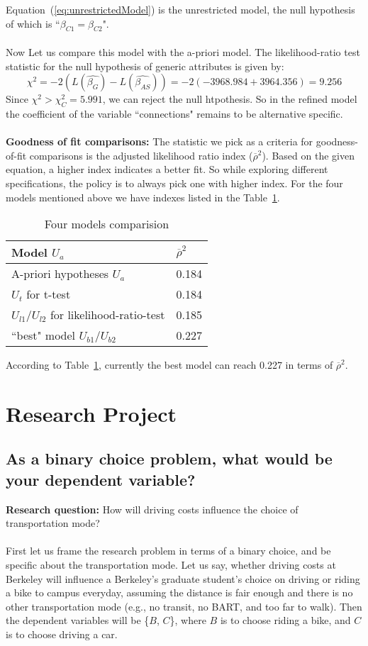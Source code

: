 \documentclass[11pt]{article}
\begin{document}
Equation~(\ref{eq:unrestrictedModel}) is the unrestricted model, the null hypothesis of which is ``$\beta_{C1}=\beta_{C2}$".\\\\
Now Let us compare this model with the a-priori model. The likelihood-ratio test statistic for the null hypothesis of generic attributes is given by:
\begin{equation}
\chi^2=-2(L(\hat{\beta_G})-L(\hat{\beta_{AS}}))=-2(-3968.984+3964.356)=9.256
\end{equation}
 Since $\chi^2>\chi_C^2=5.991$, we can reject the null htpothesis. So in the refined model the coefficient of the variable ``connections" remains to be alternative specific.\\\\
\textbf{Goodness of fit comparisons:} The statistic we pick as a criteria for goodness-of-fit comparisons is the adjusted likelihood ratio index ($\overline{\rho}^2$). Based on the given equation, a higher index indicates a better fit. So while exploring different specifications, the policy is to always pick one with higher index. For the four models mentioned above we have indexes listed in the Table~\ref{tb:4Model}.
\begin{table}[H]
	\centering
	\caption{\label{tb:4Model}Four models comparision}
	\vspace{5pt}
	\begin{tabularx}{15cm}{|X|X|}
		\hline
		Model $U_a$ & $\overline{\rho}^2$\\
		\hline
		A-priori hypotheses $U_a$ & 0.184\\
		\hline
		$U_t$ for t-test & 0.184\\
		\hline
		$U_{l1}/U_{l2}$ for likelihood-ratio-test & 0.185\\
		\hline
		``best" model $U_{b1}/U_{b2}$ & 0.227\\
		\hline
	\end{tabularx}
\end{table}
\noindent According to Table~\ref{tb:4Model}, currently the best model can reach 0.227 in terms of $\overline{\rho}^2$.

\section{Research Project}
\subsection{\small{As a binary choice problem, what would be your dependent variable?}}
\textbf{Research question:} How will driving costs influence the choice of transportation mode?\\\\
First let us frame the research problem in terms of a binary choice, and be specific about the transportation mode. Let us say, whether driving costs at Berkeley will influence a Berkeley's graduate student's choice on driving or riding a bike to campus everyday, assuming the distance is fair enough and there is no other transportation mode (e.g., no transit, no BART, and too far to walk). Then the dependent variables will be \{$B$, $C$\}, where $B$ is to choose riding a bike, and $C$ is to choose driving a car.
\end{document}
